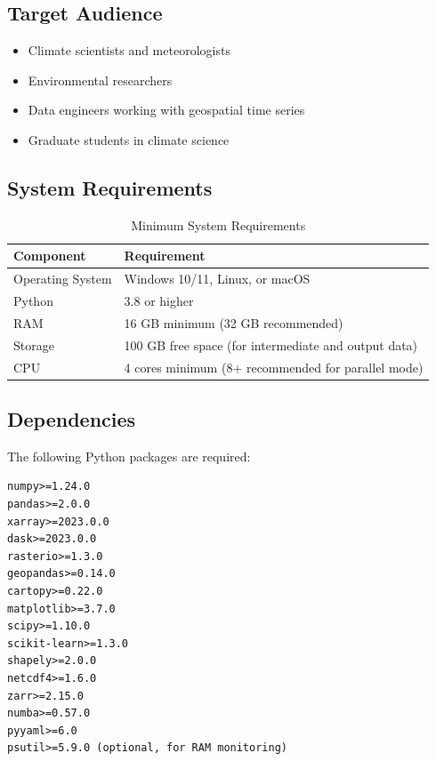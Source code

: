 ﻿\documentclass[12pt,a4paper]{report}
\begin{document}
\subsection{Target Audience}
\begin{itemize}
    \item Climate scientists and meteorologists
    \item Environmental researchers
    \item Data engineers working with geospatial time series
    \item Graduate students in climate science
\end{itemize}

\subsection{System Requirements}
\begin{table}[H]
    \centering
    \caption{Minimum System Requirements}
    \begin{tabular}{l l}
        \toprule
        \textbf{Component} & \textbf{Requirement} \\
        \midrule
        Operating System & Windows 10/11, Linux, or macOS \\
        Python & 3.8 or higher \\
        RAM & 16 GB minimum (32 GB recommended) \\
        Storage & 100 GB free space (for intermediate and output data) \\
        CPU & 4 cores minimum (8+ recommended for parallel mode) \\
        \bottomrule
    \end{tabular}
\end{table}

\subsection{Dependencies}
The following Python packages are required:
\begin{lstlisting}[caption=Required Dependencies]
numpy>=1.24.0
pandas>=2.0.0
xarray>=2023.0.0
dask>=2023.0.0
rasterio>=1.3.0
geopandas>=0.14.0
cartopy>=0.22.0
matplotlib>=3.7.0
scipy>=1.10.0
scikit-learn>=1.3.0
shapely>=2.0.0
netcdf4>=1.6.0
zarr>=2.15.0
numba>=0.57.0
pyyaml>=6.0
psutil>=5.9.0 (optional, for RAM monitoring)
\end{lstlisting}

\end{document}
